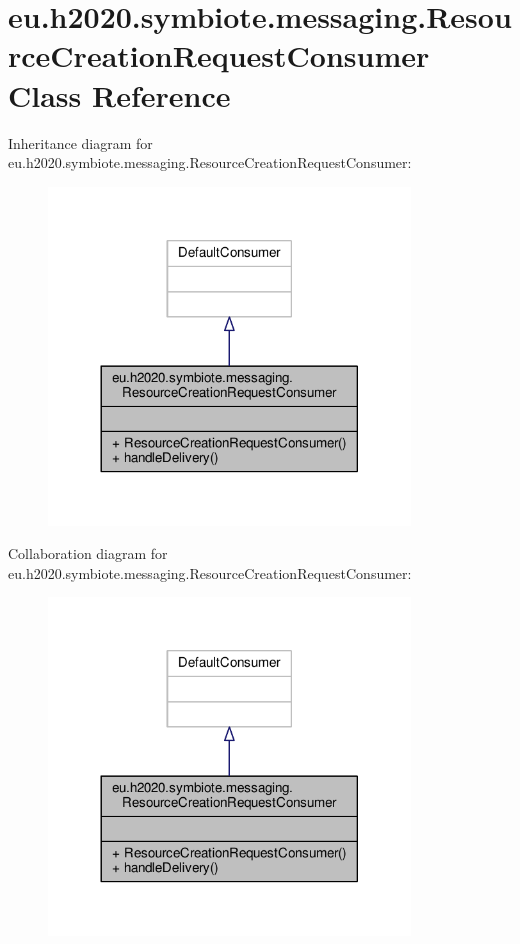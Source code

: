 \hypertarget{classeu_1_1h2020_1_1symbiote_1_1messaging_1_1ResourceCreationRequestConsumer}{}\section{eu.\+h2020.\+symbiote.\+messaging.\+Resource\+Creation\+Request\+Consumer Class Reference}
\label{classeu_1_1h2020_1_1symbiote_1_1messaging_1_1ResourceCreationRequestConsumer}


Inheritance diagram for eu.\+h2020.\+symbiote.\+messaging.\+Resource\+Creation\+Request\+Consumer\+:
\nopagebreak
\begin{figure}[H]
\begin{center}
\leavevmode
\includegraphics[width=272pt]{classeu_1_1h2020_1_1symbiote_1_1messaging_1_1ResourceCreationRequestConsumer__inherit__graph}
\end{center}
\end{figure}


Collaboration diagram for eu.\+h2020.\+symbiote.\+messaging.\+Resource\+Creation\+Request\+Consumer\+:
\nopagebreak
\begin{figure}[H]
\begin{center}
\leavevmode
\includegraphics[width=272pt]{classeu_1_1h2020_1_1symbiote_1_1messaging_1_1ResourceCreationRequestConsumer__coll__graph}
\end{center}
\end{figure}
